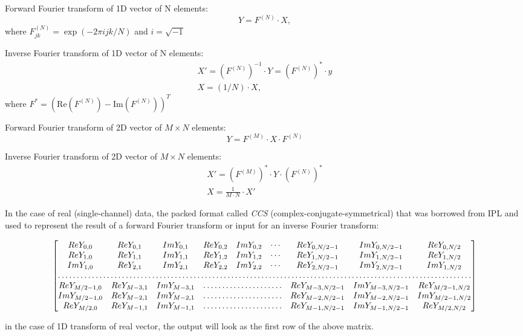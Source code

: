 Forward Fourier transform of 1D vector of N elements:
\[Y = F^{(N)} \cdot X,\]
where $F^{(N)}_{jk}=\exp(-2\pi i j k/N)$ and $i=\sqrt{-1}$

Inverse Fourier transform of 1D vector of N elements:
\[
\begin{array}{l}
X'= \left(F^{(N)}\right)^{-1} \cdot Y = \left(F^{(N)}\right)^* \cdot y \\
X = (1/N) \cdot X,
\end{array}
\]
where $F^*=\left(\textrm{Re}(F^{(N)})-\textrm{Im}(F^{(N)})\right)^T$

Forward Fourier transform of 2D vector of $M \times N$ elements:
\[Y = F^{(M)} \cdot X \cdot F^{(N)}\]

Inverse Fourier transform of 2D vector of $M \times N$ elements:
\[
\begin{array}{l}
X'= \left(F^{(M)}\right)^* \cdot Y \cdot \left(F^{(N)}\right)^*\\
X = \frac{1}{M \cdot N} \cdot X'
\end{array}
\]

In the case of real (single-channel) data, the packed format called \emph{CCS} (complex-conjugate-symmetrical) that was borrowed from IPL and used to represent the result of a forward Fourier transform or input for an inverse Fourier transform:

\[\begin{bmatrix}
Re Y_{0,0} & Re Y_{0,1} & Im Y_{0,1} & Re Y_{0,2} & Im Y_{0,2} & \cdots & Re Y_{0,N/2-1} & Im Y_{0,N/2-1} & Re Y_{0,N/2} \\
Re Y_{1,0} & Re Y_{1,1} & Im Y_{1,1} & Re Y_{1,2} & Im Y_{1,2} & \cdots & Re Y_{1,N/2-1} & Im Y_{1,N/2-1} & Re Y_{1,N/2} \\
Im Y_{1,0} & Re Y_{2,1} & Im Y_{2,1} & Re Y_{2,2} & Im Y_{2,2} & \cdots & Re Y_{2,N/2-1} & Im Y_{2,N/2-1} & Im Y_{1,N/2} \\
\hdotsfor{9} \\
Re Y_{M/2-1,0} &  Re Y_{M-3,1}  & Im Y_{M-3,1} & \hdotsfor{3} & Re Y_{M-3,N/2-1} & Im Y_{M-3,N/2-1}& Re Y_{M/2-1,N/2} \\
Im Y_{M/2-1,0} &  Re Y_{M-2,1}  & Im Y_{M-2,1} & \hdotsfor{3} & Re Y_{M-2,N/2-1} & Im Y_{M-2,N/2-1}& Im Y_{M/2-1,N/2} \\
Re Y_{M/2,0}  &  Re Y_{M-1,1} &  Im Y_{M-1,1} & \hdotsfor{3} & Re Y_{M-1,N/2-1} & Im Y_{M-1,N/2-1}& Re Y_{M/2,N/2}
\end{bmatrix}
\]

in the case of 1D transform of real vector, the output will look as the first row of the above matrix. 

